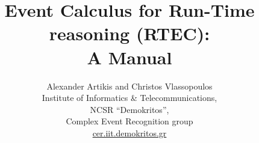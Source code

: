 \documentclass[10pt,a4paper]{article}
\title{Event Calculus for Run-Time reasoning (RTEC):\\ A Manual}
\author{Alexander Artikis and Christos Vlassopoulos \bigskip \\ 
Institute of Informatics \& Telecommunications,\\ NCSR ``Demokritos'',\\ Complex Event Recognition group\\ \url{cer.iit.demokritos.gr}}
\begin{document}
\maketitle
\sloppy












%

%



\nocite{*}
\end{document}
